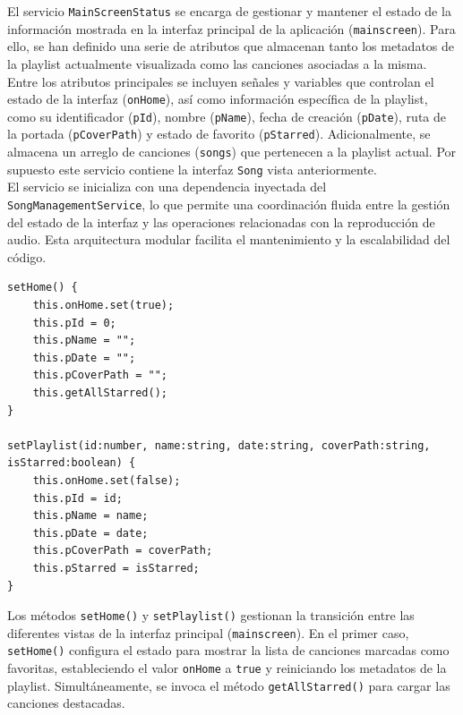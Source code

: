 \documentclass[11pt, a4paper]{article}
\begin{document}
                El servicio \texttt{MainScreenStatus} se encarga de gestionar y mantener el estado de la información mostrada en la interfaz principal de la aplicación (\texttt{mainscreen}). Para ello, se han definido una serie de atributos que almacenan tanto los metadatos de la playlist actualmente visualizada como las canciones asociadas a la misma. \\

                Entre los atributos principales se incluyen señales y variables que controlan el estado de la interfaz (\texttt{onHome}), así como información específica de la playlist, como su identificador (\texttt{pId}), nombre (\texttt{pName}), fecha de creación (\texttt{pDate}), ruta de la portada (\texttt{pCoverPath}) y estado de favorito (\texttt{pStarred}). Adicionalmente, se almacena un arreglo de canciones (\texttt{songs}) que pertenecen a la playlist actual. Por supuesto este servicio contiene la interfaz \texttt{Song} vista anteriormente. \\

                El servicio se inicializa con una dependencia inyectada del \\ \texttt{SongManagementService}, lo que permite una coordinación fluida entre la gestión del estado de la interfaz y las operaciones relacionadas con la reproducción de audio. Esta arquitectura modular facilita el mantenimiento y la escalabilidad del código. \\


                \begin{lstlisting}[caption={setHome() y setPlaylist()}]
setHome() {
    this.onHome.set(true);
    this.pId = 0;
    this.pName = "";
    this.pDate = "";
    this.pCoverPath = "";
    this.getAllStarred();
}

setPlaylist(id:number, name:string, date:string, coverPath:string, isStarred:boolean) {
    this.onHome.set(false);
    this.pId = id;
    this.pName = name;
    this.pDate = date;
    this.pCoverPath = coverPath;
    this.pStarred = isStarred;
}
                \end{lstlisting}

                Los métodos \texttt{setHome()} y \texttt{setPlaylist()} gestionan la transición entre las diferentes vistas de la interfaz principal (\texttt{mainscreen}). En el primer caso, \texttt{setHome()} configura el estado para mostrar la lista de canciones marcadas como favoritas, estableciendo el valor \texttt{onHome} a \texttt{true} y reiniciando los metadatos de la playlist. Simultáneamente, se invoca el método \texttt{getAllStarred()} para cargar las canciones destacadas. \\
\end{document}
